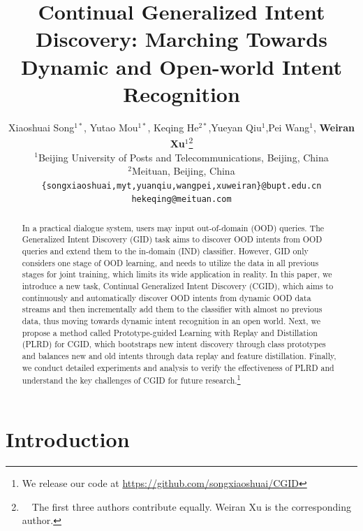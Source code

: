 \documentclass[11pt]{article}
\title{Continual Generalized Intent Discovery: Marching Towards Dynamic and Open-world Intent Recognition}
\author{Xiaoshuai Song$^{1*}$, Yutao Mou$^{1*}$, Keqing He$^{2*}$,Yueyan Qiu$^{1}$,Pei Wang$^{1}$, 
{\bf Weiran Xu$^{1}$}\thanks{\ \ The first three authors contribute equally. Weiran Xu is the corresponding author.}\\
  $^1$Beijing University of Posts and Telecommunications, Beijing, China\\
$^{2}$Meituan, Beijing, China\\
  \texttt{\{songxiaoshuai,myt,yuanqiu,wangpei,xuweiran\}@bupt.edu.cn}\\
  \texttt{hekeqing@meituan.com}
}
\begin{document}
\maketitle
\begin{abstract}
In a practical dialogue system, users may input out-of-domain (OOD) queries. The Generalized Intent Discovery (GID) task aims to discover OOD intents from OOD queries and extend them to the in-domain (IND) classifier. However, GID only considers one stage of OOD learning, and needs to utilize the data in all previous stages for joint training, which limits its wide application in reality. In this paper, we introduce a new task, Continual Generalized Intent Discovery (CGID), which aims to continuously and automatically discover OOD intents from dynamic OOD data streams and then incrementally add them to the classifier with almost no previous data, thus moving towards dynamic intent recognition in an open world. Next, we propose a method called Prototype-guided Learning with Replay and Distillation (PLRD) for CGID, which bootstraps new intent discovery through class prototypes and balances new and old intents through data replay and feature distillation. Finally, we conduct detailed experiments and analysis to verify the effectiveness of PLRD and understand the key challenges of CGID for future research.\footnote{We  release our code at \url{https://github.com/songxiaoshuai/CGID}}
\end{abstract}

\section{Introduction}

\end{document}
